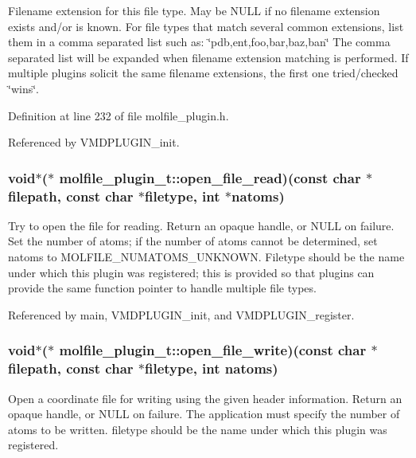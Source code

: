 Filename extension for this file type. May be NULL if no filename  extension exists and/or is known. For file types that match several common extensions, list them in a comma separated list such as: \char`\"{}pdb,ent,foo,bar,baz,ban\char`\"{} The comma separated list will be expanded when filename extension matching is performed. If multiple plugins solicit the same filename extensions, the first one tried/checked \char`\"{}wins\char`\"{}. 

Definition at line 232 of file molfile\_\-plugin.h.

Referenced by VMDPLUGIN\_\-init.
\subsubsection{\setlength{\rightskip}{0pt plus 5cm}void$\ast$($\ast$  molfile\_\-plugin\_\-t::open\_\-file\_\-read)(const char $\ast$filepath, const char $\ast${\bf filetype}, int $\ast$natoms)}\label{structmolfile__plugin__t_m1}


Try to open the file for reading. Return an opaque handle, or NULL on failure. Set the number of atoms; if the number of atoms cannot be  determined, set natoms to MOLFILE\_\-NUMATOMS\_\-UNKNOWN.  Filetype should be the name under which this plugin was registered; this is provided so that plugins can provide the same function pointer to handle multiple file types. 

Referenced by main, VMDPLUGIN\_\-init, and VMDPLUGIN\_\-register.
\subsubsection{\setlength{\rightskip}{0pt plus 5cm}void$\ast$($\ast$  molfile\_\-plugin\_\-t::open\_\-file\_\-write)(const char $\ast$filepath, const char $\ast${\bf filetype}, int natoms)}\label{structmolfile__plugin__t_m6}


Open a coordinate file for writing using the given header information. Return an opaque handle, or NULL on failure. The application must specify the number of atoms to be written.  filetype should be the name under which this plugin was registered. 

